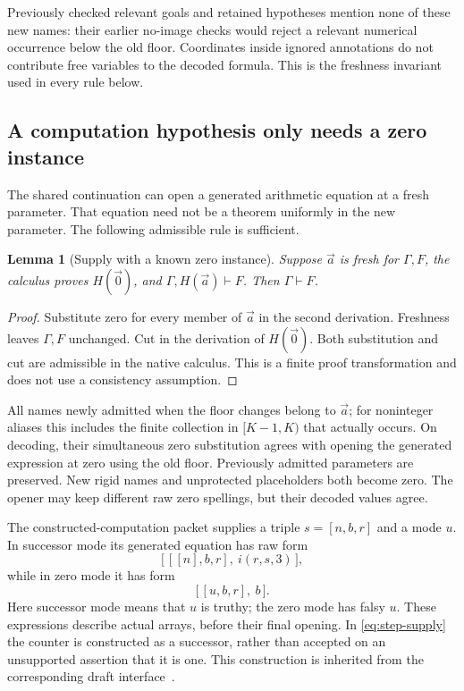 \documentclass[11pt,letterpaper]{article}
\newtheorem{lemma}[theorem]{Lemma}
\theoremstyle{definition}\newtheorem{definition}[theorem]{Definition}
\theoremstyle{remark}\newtheorem{remark}[theorem]{Remark}
\begin{document}
Previously checked relevant goals and retained hypotheses mention none
of these new names: their earlier no-image checks would reject a
relevant numerical occurrence below the old floor.  Coordinates inside
ignored annotations do not contribute free variables to the decoded
formula.  This is the freshness invariant used in every rule below.

\subsection{A computation hypothesis only needs a zero instance}
\label{subsec:zero-supply}

The shared continuation can open a generated arithmetic equation at a
fresh parameter.  That equation need not be a theorem uniformly in the
new parameter.  The following admissible rule is sufficient.

\begin{lemma}[Supply with a known zero instance]
\label{lem:zero-supply}
Suppose $\vec a$ is fresh for $\Gamma,F$, the calculus proves
$H(\vec0)$, and $\Gamma,H(\vec a)\vdash F$.  Then
$\Gamma\vdash F$.
\end{lemma}

\begin{proof}
Substitute zero for every member of $\vec a$ in the second derivation.
Freshness leaves $\Gamma,F$ unchanged.  Cut in the derivation of
$H(\vec0)$.  Both substitution and cut are admissible in the native
calculus.  This is a finite proof transformation and does not use a
consistency assumption.
\end{proof}

All names newly admitted when the floor changes belong to $\vec a$;
for noninteger aliases this includes the finite collection in
$[K-1,K)$ that actually occurs.  On decoding, their simultaneous zero
substitution agrees with opening the generated expression at zero using
the old floor.  Previously admitted parameters are preserved.  New
rigid names and unprotected placeholders both become zero.  The opener
may keep different raw zero spellings, but their decoded values agree.

The constructed-computation packet supplies a triple $s=[n,b,r]$ and a
mode $u$.  In successor mode its generated equation has raw form
\[
 \bigl[\,[[n],b,r],\ i(r,s,3)\,\bigr],
 \tag{Step supply}\label{eq:step-supply}
\]
while in zero mode it has form
\[
                    \bigl[\,[u,b,r],\ b\,\bigr].
 \tag{Zero supply}\label{eq:base-supply}
\]
Here successor mode means that $u$ is truthy; the zero mode has falsy
$u$.  These expressions describe actual arrays, before their final
opening.  In \eqref{eq:step-supply} the counter is constructed as a
successor, rather than accepted on an unsupported assertion that it is
one.  This construction is inherited from the corresponding draft
interface~\cite{constructed}.
\end{document}
